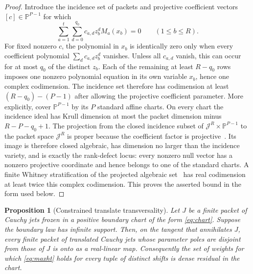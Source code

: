 \documentclass[11pt]{article}
\newtheorem{proposition}[theorem]{Proposition}
\begin{document}
\begin{proof}
Introduce the incidence set of packets and projective coefficient vectors $[c]\in\mathbb P^{P-1}$
for which
\[
  \sum_{a=1}^t\sum_{d=0}^{q_0}c_{a,d}z_b^dM_a(x_b)=0
  \qquad(1\leq b\leq R).
\]
For fixed nonzero $c$, the polynomial in $x_b$ is identically zero only when every coefficient
polynomial $\sum_dc_{a,d}z_b^d$ vanishes.  Unless all $c_{a,d}$ vanish, this can occur for at most
$q_0$ of the distinct $z_b$.  Each of the remaining at least $R-q_0$ rows imposes one nonzero
polynomial equation in its own variable $x_b$, hence one complex codimension.  The incidence set
therefore has codimension at least $(R-q_0)-(P-1)$ after allowing the projective coefficient
parameter.  More explicitly, cover $\mathbb P^{P-1}$ by its $P$ standard affine charts.  On every
chart the incidence ideal has Krull dimension at most the packet dimension minus
$R-P-q_0+1$.  The projection from the closed incidence subset of
$\mathcal J^R\times\mathbb P^{P-1}$ to the packet space $\mathcal J^R$ is proper because the
coefficient factor is projective~\cite[Chapter~II, \S4]{Hartshorne1977}.  Its image is therefore closed algebraic, has dimension no
larger than the incidence variety, and is exactly the rank-defect locus: every nonzero null vector
has a nonzero projective coordinate and hence belongs to one of the standard charts.  A finite
Whitney stratification of the projected algebraic set~\cite{Whitney1965} has real codimension at
least twice this complex codimension.  This proves the asserted bound in the form used below.
\end{proof}

\begin{proposition}[Constrained translate transversality]\label{prop:transversality}
Let $J$ be a finite packet of Cauchy jets frozen in a positive boundary chart of the form
\eqref{eq:chart}.  Suppose the boundary law has infinite support.  Then, on the tangent that
annihilates $J$, every finite packet of translated Cauchy jets whose parameter poles are disjoint
from those of $J$ is onto as a real-linear map.  Consequently the set of weights for which
\eqref{eq:maxht} holds for every tuple of distinct shifts is dense residual in the chart.
\end{proposition}
\end{document}
